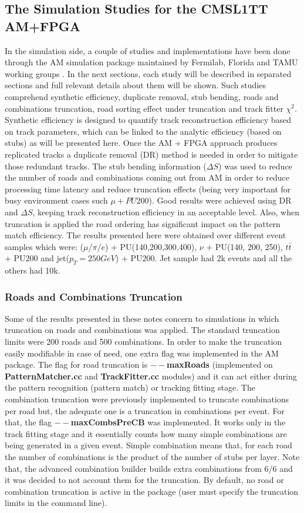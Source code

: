 \subsection{The Simulation Studies for the CMSL1TT AM+FPGA}
In the simulation side, a couple of studies and implementations have been done through the AM simulation package maintained by Fermilab, Florida and TAMU working groups \cite{bib:cmsl1tt_fnal_package}. In the next sections, each study will be described in separated sections and full relevant details about them will be shown. Such studies comprehend synthetic efficiency, duplicate removal, stub bending, roads and combinations truncation, road sorting effect under truncation and track fitter $\chi^{2}$. Synthetic efficiency is designed to quantify track reconstruction efficiency based on track parameters, which can be linked to the analytic efficiency (based on stubs) as will be presented here. Once the AM + FPGA approach produces replicated tracks a duplicate removal (DR) method is needed in order to mitigate those redundant tracks. The stub bending information ($\Delta S $) was used to reduce the number of roads and combinations coming out from AM in order to reduce processing time latency and reduce truncation effects (being very important for busy environment cases such $\mu + PU200$). Good results were achieved using DR and $\Delta S$, keeping track reconstruction efficiency in an acceptable level. Also, when truncation is applied the road ordering has significant impact on the pattern match efficiency. The results presented here were obtained over different event samples which were: ($\mu$/$\pi$/$e$) + PU(140,200,300,400), $\nu$ + PU(140, 200, 250), $t\bar{t}$ + PU200 and jet($p_{T}=250GeV$) + PU200. Jet sample had 2k events and all the others had 10k.

\subsubsection{Roads and Combinations Truncation}
Some of the results presented in these notes concern to simulations in which truncation on roads and combinations was applied. The standard truncation limits were 200 roads and 500 combinations. In order to make the truncation easily modifiable in case of need, one extra flag was implemented in the AM package. The flag for road truncation is \textbf{$--$maxRoads} (implemented on \textbf{PatternMatcher.cc} and \textbf{TrackFitter.cc} modules) and it can act either during the pattern recognition (pattern match) or tracking fitting stage. The combination truncation were previously implemented to truncate combinations per road but, the adequate one is a truncation in combinations per event. For that, the flag \textbf{$--$maxCombsPreCB} was implemented. It works only in the track fitting stage and it essentially counts how many simple combinations are being generated in a given event. Simple combination means that, for each road the number of combinations is the product of the number of stubs per layer. Note that, the advanced combination builder builds extra combinations from 6/6 and it was decided to not account them for the truncation. By default, no road or combination truncation is active in the package (user must specify the truncation limits in the command line).


